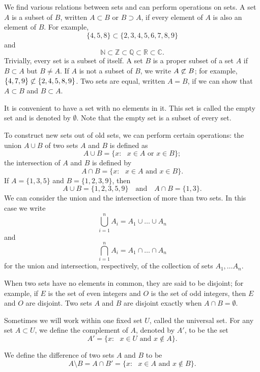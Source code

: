 We find various relations between sets and can perform operations on sets.  A set $A$ is a {\bfi subset\/} of $B$, written $A \subset B$\label{sets_contain} or $B \supset A$, if every element of $A$ is also an element of $B$.  For example,  
\[
\{4,5,8\} \subset \{2, 3, 4, 5, 6, 7, 8, 9 \}
\]
and
\[
{\mathbb N} \subset {\mathbb Z} \subset {\mathbb Q} \subset {\mathbb R} \subset {\mathbb C}.
\]
Trivially, every set is a subset of itself.  A set $B$ is a {\bfi proper subset\/} of a set $A$ if $B \subset A$ but $B \neq A$. If $A$ is not a subset of $B$, we write $A \not\subset B$; for example, $\{4, 7, 9\} \not\subset \{2, 4, 5,  8, 9 \}$.  Two sets are {\bfi equal}, written $A = B$, if we can show that $A \subset B$ and $B \subset A$.  

It is convenient to have a set with no elements in it.  This set is called the {\bfi empty set\/} and is denoted by $\emptyset$\label{sets_emptyset}.  Note that the empty set is a subset of every set.  

To construct new sets out of old sets, we can perform certain operations: the {\bfi union\/} $A \cup B$ of two sets $A$ and $B$ is defined as  
\[
A \cup B\label{sets_union} = \{x : \mbox{ $x \in A$ or $x \in B$} \};
\]
the {\bfi intersection\/} of $A$ and $B$  is defined by
\[
A \cap B\label{sets_intersection} = \{x : \mbox{ $x \in A$ and $x \in B$} \}.
\]
If $A = \{1, 3, 5\}$ and $B = \{ 1, 2, 3, 9 \}$, then
\[
A \cup B = \{1, 2, 3, 5, 9 \}
\quad \text{and} \quad
A \cap B = \{ 1, 3 \}.
\]
We can consider the union and the intersection of more than two sets.  In this case we write 
\[
\bigcup_{i = 1}^{n} A_{i} = A_{1} \cup \ldots \cup A_n
\]
and
\[
\bigcap_{i = 1}^{n} A_{i} = A_{1} \cap \ldots \cap A_n
\]
for the union and intersection, respectively, of the collection of sets $A_1, \ldots A_n$.

When two sets have no elements in common, they are said to be {\bfi disjoint}; for example, if $E$ is the set of even integers and $O$ is the set of odd integers, then $E$ and $O$ are disjoint.  Two sets $A$ and $B$ are disjoint exactly when $A \cap B = \emptyset$. 

Sometimes we will work within one fixed set $U$, called the {\bfi universal set}.  For any set $A \subset U$, we define the {\bfi complement\/} of $A$, denoted by $A'$\label{sets_complement}, to be the set 
\[
A' = \{ x : \mbox{ $x \in U$ and $x \notin A$} \}.
\]

We define the {\bfi difference\/} of two sets $A$ and $B$ to be
\[
A \setminus B\label{sets_difference} = A \cap B'  = \{ x : \mbox{ $x \in A$ and $x \notin B$} \}.
\]

